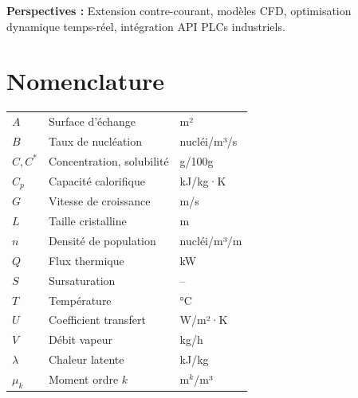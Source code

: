 \documentclass[12pt,a4paper,twoside]{article}
\begin{document}
\textbf{Perspectives :} Extension contre-courant, modèles CFD, optimisation dynamique temps-réel, intégration API PLCs industriels.

\section*{Nomenclature}

\begin{tabular}{lll}
\toprule
$A$ & Surface d'échange & m² \\
$B$ & Taux de nucléation & nucléi/m³/s \\
$C, C^*$ & Concentration, solubilité & g/100g \\
$C_p$ & Capacité calorifique & kJ/kg·K \\
$G$ & Vitesse de croissance & m/s \\
$L$ & Taille cristalline & m \\
$n$ & Densité de population & nucléi/m³/m \\
$Q$ & Flux thermique & kW \\
$S$ & Sursaturation & -- \\
$T$ & Température & °C \\
$U$ & Coefficient transfert & W/m²·K \\
$V$ & Débit vapeur & kg/h \\
$\lambda$ & Chaleur latente & kJ/kg \\
$\mu_k$ & Moment ordre $k$ & m$^k$/m³ \\
\bottomrule
\end{tabular}
\end{document}
